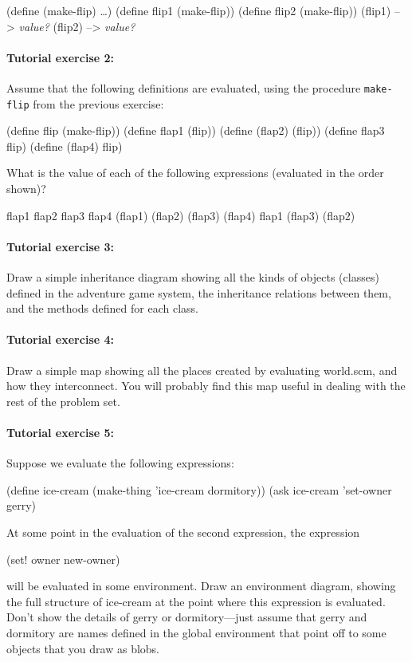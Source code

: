 \beginlisp
(define (make-flip) \ldots{})
(define flip1 (make-flip))
(define flip2 (make-flip))
\null
(flip1) --> {\em value?}
(flip2) --> {\em value?}
\endlisp

\paragraph{Tutorial exercise 2:}

Assume that the following definitions are evaluated, using
the procedure {\tt make-flip} from the previous exercise:

\beginlisp
(define flip (make-flip))
(define flap1 (flip))
(define (flap2) (flip))
(define flap3 flip)
(define (flap4) flip)
\endlisp

\noindent What is the value of each of the following expressions (evaluated
in the order shown)?

\beginlisp
flap1
\null
flap2
\null
flap3
\null
flap4
\null
(flap1)
\null
(flap2)
\null
(flap3)
\null
(flap4)
\null
flap1
\null
(flap3)
\null
(flap2)
\endlisp

\paragraph{Tutorial exercise 3:} Draw a simple inheritance diagram
showing all the kinds of objects (classes) defined in the adventure
game system, the inheritance relations between them, and the methods
defined for each class.

\paragraph{Tutorial exercise 4:} Draw a simple map showing all the
places created by evaluating {\cf world.scm}, and how they
interconnect.  You will probably find this map useful in dealing with
the rest of the problem set.

\paragraph{Tutorial exercise 5:} Suppose we evaluate the following
expressions:

\beginlisp
(define ice-cream (make-thing 'ice-cream dormitory))
(ask ice-cream 'set-owner gerry)
\endlisp

\noindent
At some point in the evaluation of the second expression, the expression

\beginlisp
(set! owner new-owner)
\endlisp

\noindent 
will be evaluated in some environment.  Draw an environment
diagram, showing the full structure of {\cf ice-cream} at the point where
this expression is evaluated.  Don't show the details of {\cf gerry}
or {\cf dormitory}---just assume that {\cf gerry} and {\cf dormitory}
are names defined in the global environment that point off to some
objects that you draw as blobs.

